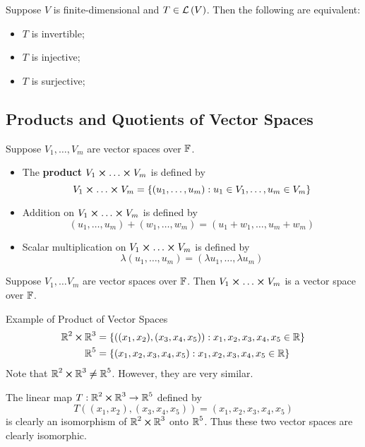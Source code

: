 \begin{theorem}
   Suppose $V$ is finite-dimensional and $T \in \mathcal{L} \left( V \right)$. Then the following
   are equivalent:
   \begin{itemize}
      \item $T$ is invertible;
      \item $T$ is injective;
      \item $T$ is surjective;
   \end{itemize}
\end{theorem}

\subsection{Products and Quotients of Vector Spaces}

\begin{definition} 
   Suppose $V_1, \dots, V_m$ are vector spaces over $\operatorname{\mathbb{F}}$.
   \begin{itemize}
      \item The \textbf{product} $V_1 \cross \dots \cross V_m$ is defined
      by \[ V_1 \cross \dots \cross V_m = \{(u_1, \dots, u_m) : u_1 \in V_1, \dots, u_m \in V_m \} \]
      \item Addition on $V_1 \cross \dots \cross V_m$ is defined by
      \[ (u_1, \dots, u_m) + (w_1, \dots, w_m) = (u_1 + w_1, \dots, u_m + w_m) \]
      \item Scalar multiplication on $V_1 \cross \dots \cross V_m$ is defined by
      \[ \lambda(u_1, \dots, u_m) = (\lambda u_1, \dots, \lambda u_m) \]
   \end{itemize}
\end{definition}

\begin{theorem} 
   Suppose $V_1, \dots V_m$ are vector spaces over $\operatorname{\mathbb{F}}$. Then $V_1 \cross \dots \cross V_m$
   is a vector space over $\operatorname{\mathbb{F}}$.
\end{theorem}

\begin{example} Example of Product of Vector Spaces
   \begin{align*}
      \operatorname{\mathbb{R}}^2 \cross &\operatorname{\mathbb{R}}^3 = \{ ((x_1, x_2), (x_3, x_4, x_5)) : x_1, x_2, x_3, x_4, x_5 \in \operatorname{\mathbb{R}} \} \\
      &\operatorname{\mathbb{R}}^5 = \{ (x_1, x_2, x_3, x_4, x_5) : x_1, x_2, x_3, x_4, x_5 \in \operatorname{\mathbb{R}} \}
   \end{align*}
   Note that $\operatorname{\mathbb{R}}^2 \cross \operatorname{\mathbb{R}}^3 \neq \operatorname{\mathbb{R}}^5$.
   However, they are very similar.

   The linear map $T: \operatorname{\mathbb{R}}^2 \cross \operatorname{\mathbb{R}}^3 \to \operatorname{\mathbb{R}}^5$ defined by
   \[ T((x_1, x_2), (x_3, x_4, x_5)) = (x_1, x_2, x_3, x_4, x_5) \]
   is clearly an isomorphism of $\operatorname{\mathbb{R}}^2 \cross \operatorname{\mathbb{R}}^3$ onto $\operatorname{\mathbb{R}}^5$. Thus
   these two vector spaces are clearly isomorphic.
\end{example}

